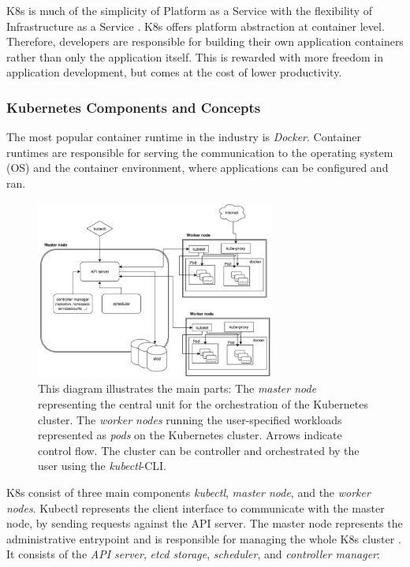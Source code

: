 K8s is much of the simplicity of Platform as a Service with the flexibility of Infrastructure as a Service \cite{k8s}. K8s offers platform abstraction at container level. Therefore, developers are responsible for building their own application containers rather than only the application itself. This is rewarded with more freedom in application development, but comes at the cost of lower productivity.

\subsubsection*{Kubernetes Components and Concepts}
The most popular container runtime in the industry is \textit{Docker}. Container runtimes are responsible for serving the communication to the operating system (OS) and the container environment, where applications can be configured and ran.
\begin{figure}
	\centering
	\includegraphics[width=0.7\textwidth]{resources/k8s_architecture}
	\caption[Architecture diagram of K8s]{This diagram illustrates the main parts: The \textit{master node} representing the central unit for the orchestration of the Kubernetes cluster. The \textit{worker nodes} running the user-specified workloads represented as \textit{pods} on the Kubernetes cluster. Arrows indicate control flow. The cluster can be controller and orchestrated by the user using the \textit{kubectl}-CLI. \cite{K8sArch}}
	\label{k8s_architecture}
\end{figure}
K8s consist of three main components \textit{kubectl}, \textit{master node}, and the \textit{worker nodes}. Kubectl represents the client interface to communicate with the master node, by sending requests against the API server. The master node represents the administrative entrypoint and is responsible for managing the whole K8s cluster \cite{K8sArch}. It consists of the \textit{API server}, \textit{etcd storage}, \textit{scheduler}, and \textit{controller manager}:

